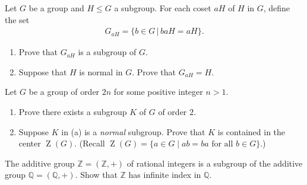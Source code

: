 \documentclass[11pt,twoside,openany]{memoir}
\begin{document}
            \newpage
            \begin{exercise}
            Let $G$ be a group and $H\le G$ a subgroup. For each coset $aH$ of $H$ in $G$, define the set
            \begin{equation*}
            \begin{split}
            G_{aH}=\{b\in G\,|\, baH=aH\}.
            \end{split}
            \end{equation*}
            \begin{enumerate}[label=(\alph*)]
                \item Prove that $G_{aH}$ is a subgroup of $G$.
                \item Suppose that $H$ is normal in $G$. Prove that $G_{aH}=H$.
            \end{enumerate}
            \end{exercise}
            
            \begin{exercise}
            Let $G$ be a group of order $2n$ for some positive integer $n>1$.
            \begin{enumerate}[label=(\alph*)]
                \item Prove there exists a subgroup $K$ of $G$ of order $2$.
                \item Suppose $K$ in (a) is a \textit{normal} subgroup. Prove that $K$ is contained in the center $\operatorname{Z}(G)$. (Recall $\operatorname{Z}(G)=\{a\in G\mid ab=ba\text{ for all }b\in G\}$.)
            \end{enumerate}
            \end{exercise}
            
            \begin{exercise}
            The additive group $\mathbb{Z}=(\mathbb{Z},+)$ of rational integers is a subgroup of the additive group $\mathbb{Q}=(\mathbb{Q},+)$. Show that $\mathbb{Z}$ has infinite index in $\mathbb{Q}$.
            \end{exercise}
\end{document}
